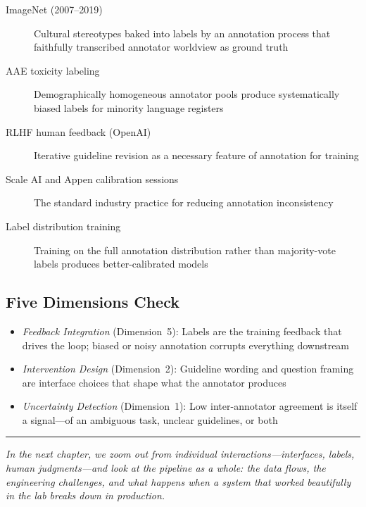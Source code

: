 \begin{description}
    \item[ImageNet (2007--2019)] Cultural stereotypes baked into labels by an annotation process that faithfully transcribed annotator worldview as ground truth
    \item[AAE toxicity labeling] Demographically homogeneous annotator pools produce systematically biased labels for minority language registers
    \item[RLHF human feedback (OpenAI)] Iterative guideline revision as a necessary feature of annotation for \ai training
    \item[Scale AI and Appen calibration sessions] The standard industry practice for reducing annotation inconsistency
    \item[Label distribution training] Training on the full annotation distribution rather than majority-vote labels produces better-calibrated models
\end{description}

\subsection*{Five Dimensions Check}

\begin{itemize}
    \item \textit{Feedback Integration} (Dimension~5): Labels are the training feedback that drives the loop; biased or noisy annotation corrupts everything downstream
    \item \textit{Intervention Design} (Dimension~2): Guideline wording and question framing are interface choices that shape what the annotator produces
    \item \textit{Uncertainty Detection} (Dimension~1): Low inter-annotator agreement is itself a signal---of an ambiguous task, unclear guidelines, or both
\end{itemize}

\bigskip
\begin{center}
\rule{0.5\textwidth}{0.4pt}
\end{center}
\bigskip

\noindent\textit{In the next chapter, we zoom out from individual interactions---interfaces, labels, human judgments---and look at the \hitl pipeline as a whole: the data flows, the engineering challenges, and what happens when a system that worked beautifully in the lab breaks down in production.}
